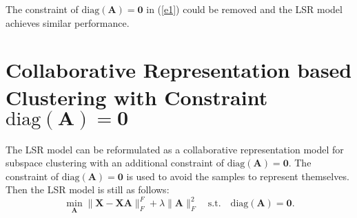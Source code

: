 \documentclass[10pt,twocolumn,letterpaper]{article}
\begin{document}
The constraint of  $\text{diag}(\bm{A})=\bm{0}$ in (\ref{e1}) could be removed and the LSR model achieves similar performance.


\section{Collaborative Representation based Clustering with Constraint $\text{diag}(\bm{A})=\bm{0}$}
The LSR model can be reformulated as a collaborative representation model \cite{crc} for subspace clustering with an additional constraint of $\text{diag}(\bm{A})=\bm{0}$. The constraint of $\text{diag}(\bm{A})=\bm{0}$ is used to avoid the samples to represent themselves. Then the LSR model \cite{lsr} is still as follows:
\begin{equation}
\label{e2}
\min_{\bm{A}}
\|
\bm{X}
-
\bm{X}\bm{A}
\|_{F}^{F}
+
\lambda
\|
\bm{A}
\|_{F}^{2}
\quad
\text{s.t.}
\quad
\text{diag}(\bm{A})=\bm{0}.
\end{equation}
\end{document}
